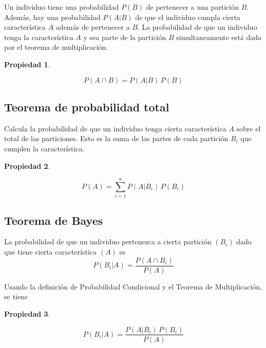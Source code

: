 \documentclass[a5paper,12pt,twoside]{book}
\newtheorem{prop}{{Propiedad}}[chapter]
\begin{document}
Un individuo tiene una probabilidad $P(B)$ de pertenecer a una partición $B$. Además, hay una probabilidad $P(A|B)$ de que el individuo cumpla cierta característica $A$ además de pertenecer a $B$. La probabilidad de que un individuo tenga la característica $A$ y sea parte de la partición $B$ simultaneamente está dada por el teorema de multiplicación.

\begin{mdframed}[style=MyFrame1]
    \begin{prop}
    \end{prop}
    \begin{equation*}
        P(A \cap B) = P(A|B) \, P(B)
    \end{equation*}
\end{mdframed}


\subsection{Teorema de probabilidad total}

Calcula la probabilidad de que un individuo tenga cierta característica $A$ sobre el total de las particiones. Esto es la suma de las partes de cada partición $B_i$ que cumplen la característica.

\begin{mdframed}[style=MyFrame1]
    \begin{prop}
    \end{prop}
    \begin{equation*}
        P(A) = \sum_{i=1}^n P(A|B_i) \, P(B_i)
    \end{equation*}
\end{mdframed}


\subsection{Teorema de Bayes}

La probabilidad de que un individuo pertenezca a cierta partición $(B_i)$ dado que tiene cierta característica $(A)$ es
\begin{equation*}
    P(B_i|A) = \frac{P(A \cap B_i)}{P(A)}
\end{equation*}

Usando la definición de Probabilidad Condicional y el Teorema de Multiplicación, se tiene

\begin{mdframed}[style=MyFrame1]
    \begin{prop}
    \end{prop}
    \begin{equation*}
        P(B_i|A) = \frac{P(A|B_i) \, P(B_i)}{P(A)}
    \end{equation*}
\end{mdframed}
\end{document}
